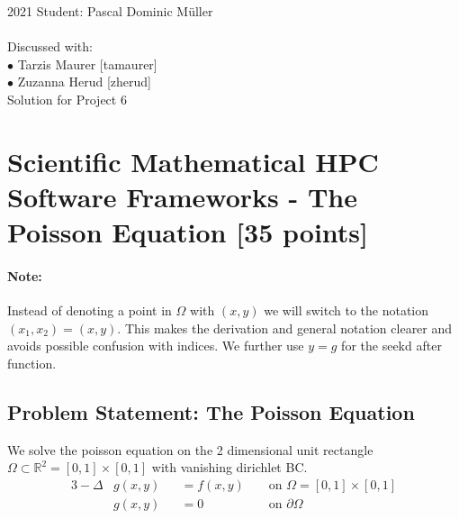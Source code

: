 \documentclass[unicode,11pt,a4paper,oneside,numbers=endperiod,openany]{scrartcl}
\begin{document}
\setassignment
{}

    {2021}
    {Student: Pascal Dominic Müller}
    {\\ \\ Discussed with: \\
        $\bullet$ Tarzis Maurer [tamaurer] \\
        $\bullet$ Zuzanna Herud [zherud] \\
    }
    {Solution for Project 6}
    {}
\newline

\assignmentpolicy


\section{Scientific Mathematical HPC Software Frameworks - The Poisson Equation [35 points]}

\paragraph{Note:} Instead of denoting a point in $\Omega$ with $(x, y)$ we
will switch to the notation $(x_1,x_2)=(x,y)$. This makes the derivation and
general notation clearer and avoids possible confusion with indices.
We further use $y=g$ for the seekd after function.

\subsection{Problem Statement: The Poisson Equation}



We solve the poisson equation on the 2 dimensional unit rectangle
$\Omega \subset \mathbb R^2=[0,1] \times [0,1]$ with vanishing dirichlet BC.
\begin{alignat}{3}
  -\Delta &g(x, y) &&= f(x, y) &&\text{  on  } \Omega = [0,1] \times [0,1]\\
          &g(x, y) &&= 0 &&\text{  on  } \partial \Omega
\end{alignat}
\end{document}
